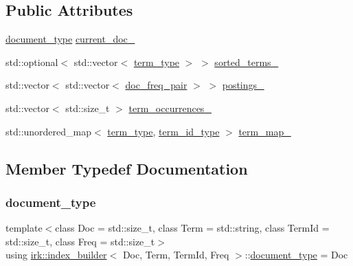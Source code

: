 \subsection*{Public Attributes}
\begin{DoxyCompactItemize}
\item 
\mbox{\hyperlink{classirk_1_1index__builder_a4230ae91e9f84c95ee99b3607c6e952e}{document\+\_\+type}} \mbox{\hyperlink{classirk_1_1index__builder_a5d40288309af28bfcfc48aed2e2d97d1}{current\+\_\+doc\+\_\+}}
\item 
std\+::optional$<$ std\+::vector$<$ \mbox{\hyperlink{classirk_1_1index__builder_ad80a8f10f3e72ed3b9a2f181350f3f1f}{term\+\_\+type}} $>$ $>$ \mbox{\hyperlink{classirk_1_1index__builder_abf42fb9c98133b69f1a201c50310e8f4}{sorted\+\_\+terms\+\_\+}}
\item 
std\+::vector$<$ std\+::vector$<$ \mbox{\hyperlink{structirk_1_1index__builder_1_1doc__freq__pair}{doc\+\_\+freq\+\_\+pair}} $>$ $>$ \mbox{\hyperlink{classirk_1_1index__builder_aa64eef56687fc708cbf0b1ec7342c45c}{postings\+\_\+}}
\item 
std\+::vector$<$ std\+::size\+\_\+t $>$ \mbox{\hyperlink{classirk_1_1index__builder_ab2c35e654feb4e162215cc2e684b1241}{term\+\_\+occurrences\+\_\+}}
\item 
std\+::unordered\+\_\+map$<$ \mbox{\hyperlink{classirk_1_1index__builder_ad80a8f10f3e72ed3b9a2f181350f3f1f}{term\+\_\+type}}, \mbox{\hyperlink{classirk_1_1index__builder_a6736f4a9aa142d3ca15c5e8c3b0a352f}{term\+\_\+id\+\_\+type}} $>$ \mbox{\hyperlink{classirk_1_1index__builder_aa4f91b07c97bcb9830983f72c4eba42b}{term\+\_\+map\+\_\+}}
\end{DoxyCompactItemize}


\subsection{Member Typedef Documentation}
\mbox{\label{classirk_1_1index__builder_a4230ae91e9f84c95ee99b3607c6e952e}} 
\subsubsection{\texorpdfstring{document\+\_\+type}{document\_type}}
{\footnotesize\ttfamily template$<$class Doc  = std\+::size\+\_\+t, class Term  = std\+::string, class Term\+Id  = std\+::size\+\_\+t, class Freq  = std\+::size\+\_\+t$>$ \\
using \mbox{\hyperlink{classirk_1_1index__builder}{irk\+::index\+\_\+builder}}$<$ Doc, Term, Term\+Id, Freq $>$\+::\mbox{\hyperlink{classirk_1_1index__builder_a4230ae91e9f84c95ee99b3607c6e952e}{document\+\_\+type}} =  Doc}

